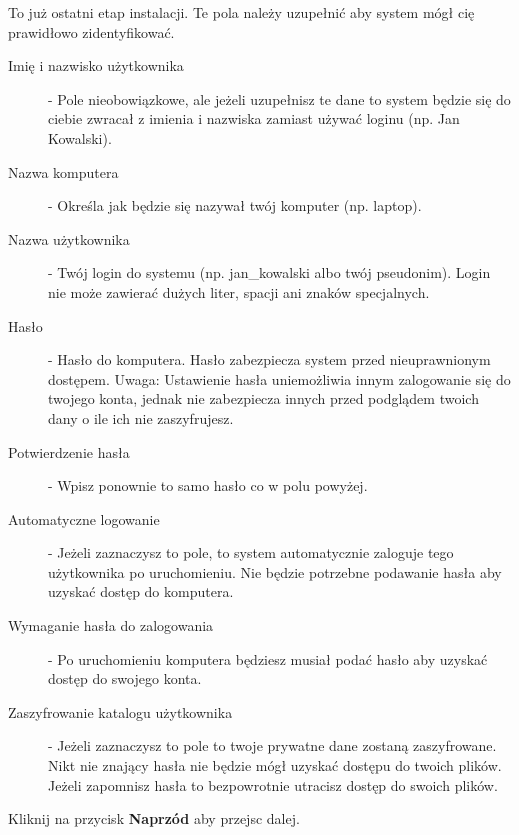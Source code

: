 To już ostatni etap instalacji. Te pola należy uzupełnić aby system mógł cię prawidłowo zidentyfikować.
\begin{description}
\item[Imię i nazwisko użytkownika] - Pole nieobowiązkowe, ale jeżeli uzupełnisz te dane to system będzie się do ciebie zwracał z imienia i nazwiska zamiast używać loginu (np. Jan Kowalski).
\item[Nazwa komputera] - Określa jak będzie się nazywał twój komputer (np. laptop).
\item[Nazwa użytkownika] - Twój login do systemu (np. jan\_kowalski albo twój pseudonim). Login nie może zawierać dużych liter, spacji ani znaków specjalnych.
\item[Hasło] - Hasło do komputera. Hasło zabezpiecza system przed nieuprawnionym dostępem. Uwaga: Ustawienie hasła uniemożliwia innym zalogowanie się do twojego konta, jednak nie zabezpiecza innych przed podglądem twoich dany o ile ich nie zaszyfrujesz. 
\item[Potwierdzenie hasła] - Wpisz ponownie to samo hasło co w polu powyżej.
\item[Automatyczne logowanie] - Jeżeli zaznaczysz to pole, to system automatycznie zaloguje tego użytkownika po uruchomieniu. Nie będzie potrzebne podawanie hasła aby uzyskać dostęp do komputera.
\item[Wymaganie hasła do zalogowania] - Po uruchomieniu komputera będziesz musiał podać hasło aby uzyskać dostęp do swojego konta.
\item[Zaszyfrowanie katalogu użytkownika] - Jeżeli zaznaczysz to pole to twoje prywatne dane zostaną zaszyfrowane. Nikt nie znający hasła nie będzie mógł uzyskać dostępu do twoich plików. Jeżeli zapomnisz hasła to bezpowrotnie utracisz dostęp do swoich plików.
\end{description}

\begin{flushright}
Kliknij na przycisk \textbf{Naprzód} aby przejsc dalej.
\end{flushright}
\clearpage


